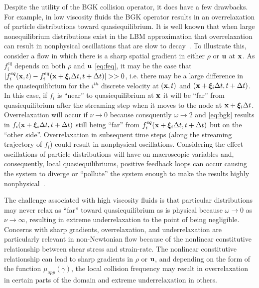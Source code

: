 Despite the utility of the BGK collision operator, it does have a few drawbacks.
For example, in low viscosity fluids the BGK operator results in an overrelaxation of particle distributions toward quasiequilibrium.
It is well known that when large nonequilibrium distributions exist in the LBM approximation that overrelaxation can result in nonphysical oscillations that are slow to decay~\cite{brownlee2007stability,dellar2003incompressible}.
To illustrate this, consider a flow in which there is a sharp spatial gradient in either $\rho$ or $\mathbf{u}$ at $\mathbf{x}$.
As $f_i^{eq}$ depends on both $\rho$ and $\mathbf{u}$ \eqref{eq:feq}, it may be the case that $|f_i^{eq}(\mathbf{x}, t) - f_i^{eq}(\mathbf{x} + \boldsymbol{\xi}_i \Delta t, t + \Delta t)| >> 0$, i.e. there may be a large difference in the quasiequilibrium for the $i^{th}$ discrete velocity at $(\mathbf{x}, t)$ and $(\mathbf{x} + \boldsymbol{\xi}_i \Delta t, t + \Delta t)$.
In this case, if $f_i$ is ``near'' to quasiequilibrium at $\mathbf{x}$ it will be ``far'' from quasiequilibrium after the streaming step when it moves to the node at $\mathbf{x} + \boldsymbol{\xi}_i \Delta t$.
Overrelaxation will occur if $\nu \rightarrow 0$ because consquently $\omega \rightarrow 2$ and \eqref{eq:bgk} results in $f_i(\mathbf{x} + \boldsymbol{\xi}_i \Delta t,t + \Delta t)$ still being ``far'' from $f^{eq}_i(\mathbf{x} + \boldsymbol{\xi}_i \Delta t,t + \Delta t)$ but on the ``other side''.
Overrelaxation in subsequent time steps (along the streaming trajectory of $f_i$) could result in nonphysical oscillations.
Considering the effect oscillations of particle distributions will have on macroscopic variables and, consequently, local quasiequilibriums, positive feedback loops can occur causing the system to diverge or ``pollute'' the system enough to make the results highly nonphysical~\cite{gorban2014enhancement}.

The challenge associated with high viscosity fluids is that particular distributions may never relax as ``far'' toward quasiequilibrium as is physical because $\omega \rightarrow 0$ as $\nu \rightarrow \infty$, resulting in extreme underrelaxation to the point of being negligible.
Concerns with sharp gradients, overrelaxation, and underrelaxation are particularly relevant in non-Newtonian flow because of the nonlinear constitutive relationship between shear stress and strain-rate.
The nonlinear constitutive relationship can lead to sharp gradients in $\rho$ or $\mathbf{u}$, and depending on the form of the function $\mu_{app}(\dot{\gamma})$, the local collision frequency may result in overrelaxation in certain parts of the domain and extreme underrelaxation in others.


